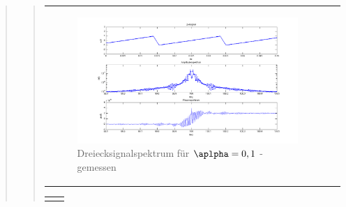 \begin{quote}
\begin{quote}
\begin{center}
\begin{tabular}{ll}
\begin{minipage}{0.6\textwidth}
                \end{minipage}
                \begin{minipage}{0.6\textwidth}

                    \begin{figure}[H]
                        \label{fig:}            
                        \includegraphics[scale=0.3]{./Bilder/drei_alpha1_-_gemessen.png} %
                        \caption{Dreiecksignalspektrum für $\aplpha = 0,1$ - gemessen}
                    \end{figure}                
                \vspace{-1.5em}

                \end{minipage}

            \end{tabular}
            \end{center}

            \begin{center}
            \begin{tabular}{ll}

            \hspace{-12em}
                \begin{minipage}{0.6\textwidth}


\end{minipage}
\end{tabular}
\end{center}
\end{quote}
\end{quote}

